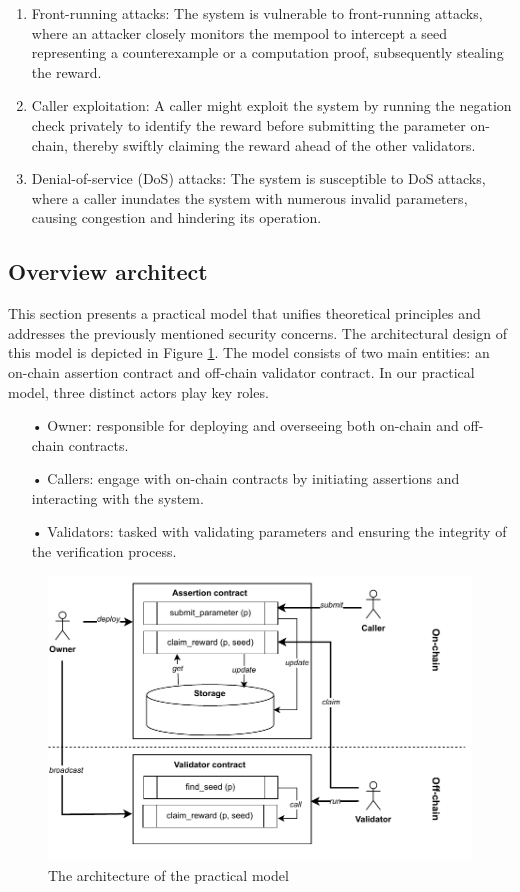 \documentclass[runningheads]{llncs}
\begin{document}
\begin{enumerate}
\item Front-running attacks: The system is vulnerable to front-running attacks, where an attacker closely monitors the mempool to intercept a seed representing a counterexample or a computation proof, subsequently stealing the reward.
\item Caller exploitation: A caller might exploit the system by running the negation check privately to identify the reward before submitting the parameter on-chain, thereby swiftly claiming the reward ahead of the other validators. 
\item Denial-of-service (DoS) attacks: The system is susceptible to DoS attacks, where a caller inundates the system with numerous invalid parameters, causing congestion and hindering its operation.
\end{enumerate}
\subsection{Overview architect}
This section presents a practical model that unifies theoretical principles and addresses the previously mentioned security concerns. The architectural design of this model is depicted in Figure \ref{fig.architect}. The model consists of two main entities: an on-chain assertion contract and off-chain validator contract. In our practical model, three distinct actors play key roles.
\begin{itemize}
\item[•] Owner: responsible for deploying and overseeing both on-chain and off-chain contracts.
\item[•] Callers: engage with on-chain contracts by initiating assertions and interacting with the system.
\item[•] Validators: tasked with validating parameters and ensuring the integrity of the verification process.
\end{itemize}


\begin{figure}
\centering
\includegraphics[scale=.8]{assertion}
\caption{The architecture of the practical model}
\label{fig.architect}
\end{figure}
\end{document}
